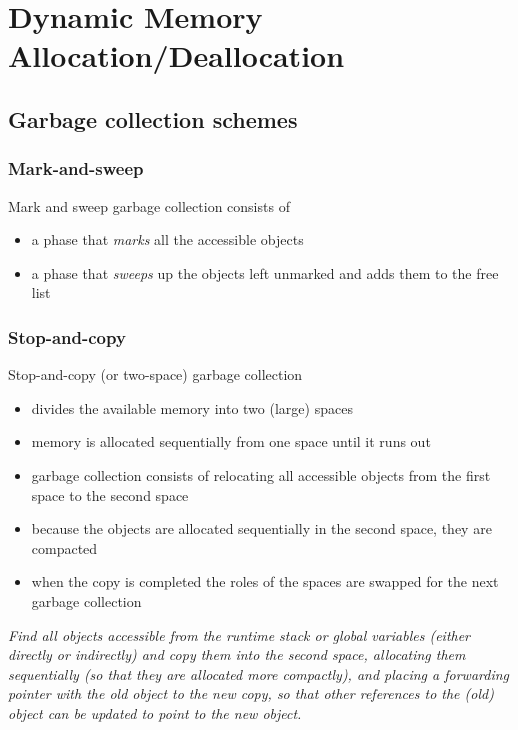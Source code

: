 \documentclass[fontsize=10pt,a4paper]{article}
\begin{document}
\begin{multicols}{3}
\begin{itemize}
    \end{itemize}

    \section{Dynamic Memory Allocation/Deallocation}

    \subsection{Garbage collection schemes}

    \subsubsection{Mark-and-sweep}

    Mark and sweep garbage collection consists of

    \begin{itemize}
        \item a phase that \textit{marks} all the accessible objects
        \item a phase that \textit{sweeps} up the objects left unmarked and adds them to the free list
    \end{itemize}

    \subsubsection{Stop-and-copy}

    Stop-and-copy (or two-space) garbage collection

    \begin{itemize}
        \item divides the available memory into two (large) spaces
        \item memory is allocated sequentially from one space until it runs out
        \item garbage collection consists of relocating all accessible objects from the first space to the second space
        \item because the objects are allocated sequentially in the second space, they are compacted
        \item when the copy is completed the roles of the spaces are swapped for the next garbage collection
    \end{itemize}

    \textit{Find all objects accessible from the runtime stack or global variables (either directly or indirectly) and copy them into the second space, allocating them sequentially (so that they are allocated more compactly), and placing a forwarding pointer with the old object to the new copy, so that other references to the (old) object can be updated to point to the new object.}


\end{multicols}
\end{document}
